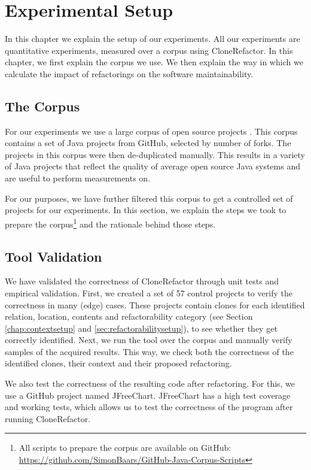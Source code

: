 \chapter{Experimental Setup}\label{ch:experimentalsetup}
In this chapter we explain the setup of our experiments. All our experiments are quantitative experiments, measured over a corpus using CloneRefactor. In this chapter, we first explain the corpus we use. We then explain the way in which we calculate the impact of refactorings on the software maintainability.

\section{The Corpus}\label{chap:corpus}
For our experiments we use a large corpus of open source projects \cite{githubCorpus2013}. This corpus contains a set of Java projects from GitHub, selected by number of forks. The projects in this corpus were then de-duplicated manually. This results in a variety of Java projects that reflect the quality of average open source Java systems and are useful to perform measurements on.

For our purposes, we have further filtered this corpus to get a controlled set of projects for our experiments. In this section, we explain the steps we took to prepare the corpus\footnote{All scripts to prepare the corpus are available on GitHub: \url{https://github.com/SimonBaars/GitHub-Java-Corpus-Scripts}} and the rationale behind those steps.

\section{Tool Validation}
We have validated the correctness of CloneRefactor through unit tests and empirical validation. First, we created a set of 57 control projects to verify the correctness in many (edge) cases. These projects contain clones for each identified relation, location, contents and refactorability category (see Section \ref{chap:contextsetup} and \ref{sec:refactorabilitysetup}), to see whether they get correctly identified. Next, we run the tool over the corpus and manually verify samples of the acquired results. This way, we check both the correctness of the identified clones, their context and their proposed refactoring.

We also test the correctness of the resulting code after refactoring. For this, we use a GitHub project named JFreeChart. JFreeChart has a high test coverage and working tests, which allows us to test the correctness of the program after running CloneRefactor. 

